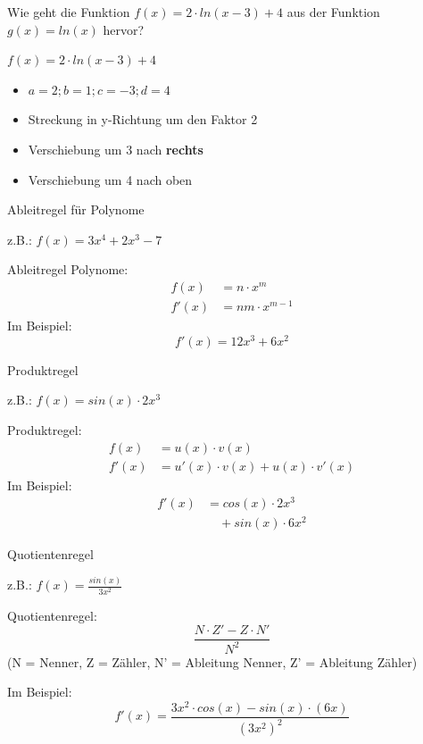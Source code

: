 \begin{frage}Wie geht die Funktion $f(x)=2 \cdot ln(x-3)+4$ aus der 
	Funktion $g(x)=ln(x)$ hervor?\end{frage}
\begin{antwort}$f(x)=2 \cdot ln(x-3)+4$
	\begin{itemize}
		\item $a=2;b=1;c=-3;d=4$
		\item Streckung in y-Richtung um den Faktor 2		
		\item Verschiebung um 3 nach \textbf{rechts}
		\item Verschiebung um 4 nach oben							
	\end{itemize}\end{antwort}
\begin{frage}Ableitregel für Polynome
	
	z.B.: $f(x)=3x^4+2x^3-7$\end{frage}
\begin{antwort}Ableitregel Polynome:
	\begin{align*}
	f(x) &= n \cdot x^m \\
	f'(x) &= nm \cdot x^{m-1}
	\end{align*}
	Im Beispiel:
	\[
	f'(x)=12x^3+6x^2
	\]\end{antwort}
\begin{frage}Produktregel
	
	z.B.: $f(x)=sin(x)\cdot2x^3$\end{frage}
\begin{antwort}Produktregel:
	\begin{align*}
	f(x) &= u(x)\cdot v(x) \\
	f'(x)&=u'(x)\cdot v(x)+u(x)\cdot v'(x)
	\end{align*}
	Im Beispiel:
	\begin{align*}
	f'(x)&=cos(x)\cdot 2x^3 \\
	&\quad+ sin(x)\cdot 6x^2
	\end{align*}\end{antwort}
\begin{frage}Quotientenregel
	
	z.B.: $f(x)=\frac{sin(x)}{3x^2}$\end{frage}
\begin{antwort}Quotientenregel:
	\normalsize
	\[
	\frac{N \cdot Z' - Z \cdot N'}{N^2}
	\]
	\scriptsize (N = Nenner, Z = Zähler, N' = Ableitung Nenner, Z' = Ableitung Zähler)
	
	\Large
	Im Beispiel:
	\[
	f'(x)=\frac{3x^2 \cdot cos(x) - sin(x) \cdot (6x)}{(3x^2)^2}
	\]\end{antwort}
